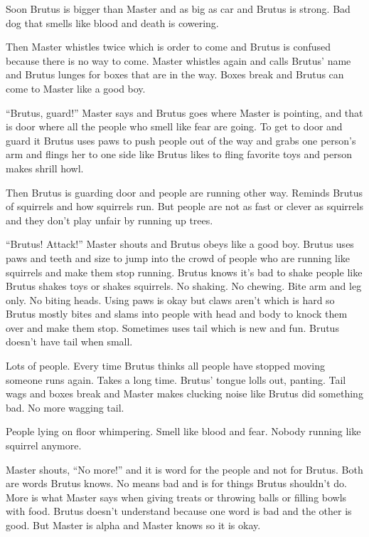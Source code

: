 Soon Brutus is bigger than Master and as big as car and Brutus is strong.  Bad dog that smells like blood and death is cowering.



Then Master whistles twice which is order to come and Brutus is confused because there is no way to come.  Master whistles again and calls Brutus' name and Brutus lunges for boxes that are in the way.  Boxes break and Brutus can come to Master like a good boy.



``Brutus, guard!'' Master says and Brutus goes where Master is pointing, and that is door where all the people who smell like fear are going.  To get to door and guard it Brutus uses paws to push people out of the way and grabs one person's arm and flings her to one side like Brutus likes to fling favorite toys and person makes shrill howl.



Then Brutus is guarding door and people are running other way.  Reminds Brutus of squirrels and how squirrels run.  But people are not as fast or clever as squirrels and they don't play unfair by running up trees.



``Brutus!  Attack!'' Master shouts and Brutus obeys like a good boy.  Brutus uses paws and teeth and size to jump into the crowd of people who are running like squirrels and make them stop running.  Brutus knows it's bad to shake people like Brutus shakes toys or shakes squirrels.  No shaking.  No chewing.  Bite arm and leg only.  No biting heads.  Using paws is okay but claws aren't which is hard so Brutus mostly bites and slams into people with head and body to knock them over and make them stop.  Sometimes uses tail which is new and fun.  Brutus doesn't have tail when small.



Lots of people.  Every time Brutus thinks all people have stopped moving someone runs again.  Takes a long time.  Brutus' tongue lolls out, panting.  Tail wags and boxes break and Master makes clucking noise like Brutus did something bad.  No more wagging tail.



People lying on floor whimpering.  Smell like blood and fear.  Nobody running like squirrel anymore.



Master shouts, ``No more!''  and it is word for the people and not for Brutus.  Both are words Brutus knows.  No means bad and is for things Brutus shouldn't do.  More is what Master says when giving treats or throwing balls or filling bowls with food.  Brutus doesn't understand because one word is bad and the other is good.  But Master is alpha and Master knows so it is okay.



